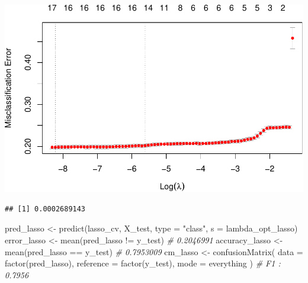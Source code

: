 \documentclass[
]{article}
\newenvironment{Shaded}{\begin{snugshade}}{\end{snugshade}}
\newcommand{\AttributeTok}[1]{\textcolor[rgb]{0.77,0.63,0.00}{#1}}
\newcommand{\CommentTok}[1]{\textcolor[rgb]{0.56,0.35,0.01}{\textit{#1}}}
\newcommand{\FunctionTok}[1]{\textcolor[rgb]{0.00,0.00,0.00}{#1}}
\newcommand{\NormalTok}[1]{#1}
\newcommand{\OtherTok}[1]{\textcolor[rgb]{0.56,0.35,0.01}{#1}}
\newcommand{\SpecialCharTok}[1]{\textcolor[rgb]{0.00,0.00,0.00}{#1}}
\newcommand{\StringTok}[1]{\textcolor[rgb]{0.31,0.60,0.02}{#1}}
\begin{document}
\includegraphics{Rain_Australia_files/figure-latex/unnamed-chunk-1-2.pdf}

\begin{Shaded}
\end{Shaded}

\begin{verbatim}
## [1] 0.0002689143
\end{verbatim}

\begin{Shaded}
\begin{Highlighting}[]
\NormalTok{pred\_lasso }\OtherTok{\textless{}{-}}
  \FunctionTok{predict}\NormalTok{(lasso\_cv, X\_test, }\AttributeTok{type =} \StringTok{"class"}\NormalTok{, }\AttributeTok{s =}\NormalTok{ lambda\_opt\_lasso)}
\NormalTok{error\_lasso }\OtherTok{\textless{}{-}} \FunctionTok{mean}\NormalTok{(pred\_lasso }\SpecialCharTok{!=}\NormalTok{ y\_test) }\CommentTok{\# 0.2046991}
\NormalTok{accuracy\_lasso }\OtherTok{\textless{}{-}} \FunctionTok{mean}\NormalTok{(pred\_lasso }\SpecialCharTok{==}\NormalTok{ y\_test) }\CommentTok{\#  0.7953009}
\NormalTok{cm\_lasso }\OtherTok{\textless{}{-}}
  \FunctionTok{confusionMatrix}\NormalTok{(}
    \AttributeTok{data =} \FunctionTok{factor}\NormalTok{(pred\_lasso),}
    \AttributeTok{reference =} \FunctionTok{factor}\NormalTok{(y\_test),}
    \AttributeTok{mode =} \StringTok{\textquotesingle{}everything\textquotesingle{}}
\NormalTok{  ) }\CommentTok{\# F1 : 0.7956}
\end{Highlighting}
\end{Shaded}
\end{document}
